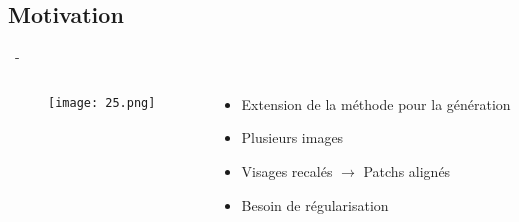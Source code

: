 \documentclass[aspectratio=169, 22pt]{beamer}
\begin{document}
\subsection{Motivation}
\begin{frame}{\secname~- \subsecname}
  \begin{columns}
    \begin{column}{0.3\linewidth}
      \begin{figure}
        \centering
        \texttt{[image: 25.png]}
      \end{figure}
    \end{column}
    \begin{column}{0.7\linewidth}
      \begin{itemize}
      \item Extension de la méthode pour la génération
      \item Plusieurs images
      \item Visages recalés $\rightarrow$ Patchs alignés
        \vspace{1em}
      \item Besoin de \alert{régularisation}
      \end{itemize}
    \end{column}
  \end{columns}
\end{frame}
\end{document}
